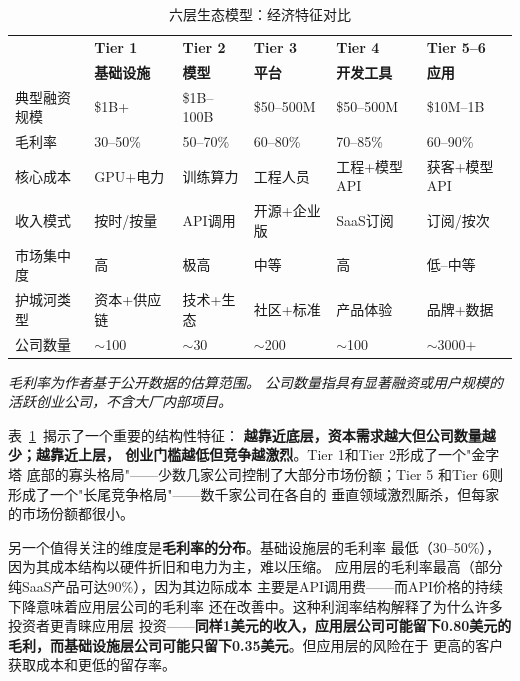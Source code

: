 \begin{table}[htbp]
\centering
\caption{六层生态模型：经济特征对比}
\label{tab:tier-economics}
\small
\begin{tabularx}{\textwidth}{l l l l l l}
\toprule
\rowcolor{figLightGray}
 & \textbf{Tier 1} & \textbf{Tier 2} & \textbf{Tier 3}
 & \textbf{Tier 4} & \textbf{Tier 5--6} \\
\rowcolor{figLightGray}
 & \textbf{基础设施} & \textbf{模型} & \textbf{平台}
 & \textbf{开发工具} & \textbf{应用} \\
\midrule
典型融资规模 & \$1B+ & \$1B--100B & \$50--500M
  & \$50--500M & \$10M--1B \\
\rowcolor{figLightGray}
毛利率 & 30--50\% & 50--70\% & 60--80\%
  & 70--85\% & 60--90\% \\
核心成本 & GPU+电力 & 训练算力 & 工程人员
  & 工程+模型API & 获客+模型API \\
\rowcolor{figLightGray}
收入模式 & 按时/按量 & API调用 & 开源+企业版
  & SaaS订阅 & 订阅/按次 \\
市场集中度 & 高 & 极高 & 中等
  & 高 & 低--中等 \\
\rowcolor{figLightGray}
护城河类型 & 资本+供应链 & 技术+生态 & 社区+标准
  & 产品体验 & 品牌+数据 \\
公司数量 & $\sim$100 & $\sim$30 & $\sim$200
  & $\sim$100 & $\sim$3000+ \\
\bottomrule
\end{tabularx}

\medskip
\noindent\textit{毛利率为作者基于公开数据的估算范围。
公司数量指具有显著融资或用户规模的活跃创业公司，不含大厂内部项目。}
\end{table}

表~\ref{tab:tier-economics}~揭示了一个重要的结构性特征：
\textbf{越靠近底层，资本需求越大但公司数量越少；越靠近上层，
创业门槛越低但竞争越激烈}。Tier 1和Tier 2形成了一个"金字塔
底部的寡头格局"——少数几家公司控制了大部分市场份额；Tier 5
和Tier 6则形成了一个"长尾竞争格局"——数千家公司在各自的
垂直领域激烈厮杀，但每家的市场份额都很小。

另一个值得关注的维度是\textbf{毛利率的分布}。基础设施层的毛利率
最低（30--50\%），因为其成本结构以硬件折旧和电力为主，难以压缩。
应用层的毛利率最高（部分纯SaaS产品可达90\%），因为其边际成本
主要是API调用费——而API价格的持续下降意味着应用层公司的毛利率
还在改善中。这种利润率结构解释了为什么许多投资者更青睐应用层
投资——\textbf{同样1美元的收入，应用层公司可能留下0.80美元的
毛利，而基础设施层公司可能只留下0.35美元}。但应用层的风险在于
更高的客户获取成本和更低的留存率。

